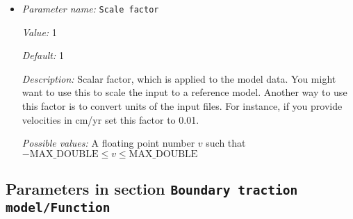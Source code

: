 \begin{itemize}
{\it Possible values:} An integer $n$ such that $-2147483648\leq n \leq 2147483647$
\item {\it Parameter name:} {\tt Scale factor}
\label{parameters:Boundary traction model/Ascii data model/Scale factor}


{\it Value:} 1


{\it Default:} 1


{\it Description:} Scalar factor, which is applied to the model data. You might want to use this to scale the input to a reference model. Another way to use this factor is to convert units of the input files. For instance, if you provide velocities in cm/yr set this factor to 0.01.


{\it Possible values:} A floating point number $v$ such that $-\text{MAX\_DOUBLE} \leq v \leq \text{MAX\_DOUBLE}$
\end{itemize}

\subsection{Parameters in section \tt Boundary traction model/Function}
\label{parameters:Boundary_20traction_20model/Function}

